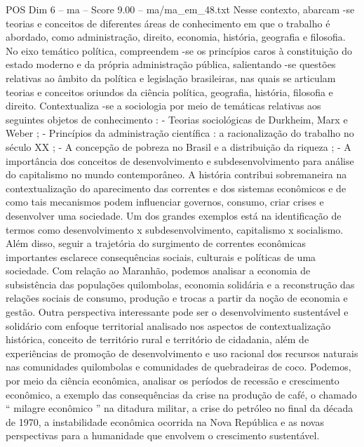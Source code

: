 \begin{textsample}{POS Dim 6 – ma – Score 9.00 – ma/ma\_em\_48.txt}
Nesse contexto, abarcam -se teorias e conceitos de diferentes áreas de conhecimento em que o trabalho é abordado, como administração, direito, economia, história, geografia e filosofia.
No eixo temático política, compreendem -se os princípios caros à constituição do estado moderno e da própria administração pública, salientando -se questões relativas ao âmbito da política e legislação brasileiras, nas quais se articulam teorias e conceitos oriundos da ciência política, geografia, história, filosofia e direito.
Contextualiza -se a sociologia por meio de temáticas relativas aos seguintes objetos de conhecimento : - Teorias sociológicas de Durkheim, Marx e Weber ; - Princípios da administração científica : a racionalização do trabalho no século XX ; - A concepção de pobreza no Brasil e a distribuição da riqueza ; - A importância dos conceitos de desenvolvimento e subdesenvolvimento para análise do capitalismo no mundo contemporâneo.
A história contribui sobremaneira na contextualização do aparecimento das correntes e dos sistemas econômicos e de como tais mecanismos podem influenciar governos, consumo, criar crises e desenvolver uma sociedade.
Um dos grandes exemplos está na identificação de termos como desenvolvimento x subdesenvolvimento, capitalismo x socialismo.
Além disso, seguir a trajetória do surgimento de correntes econômicas importantes esclarece consequências sociais, culturais e políticas de uma sociedade.
Com relação ao Maranhão, podemos analisar a economia de subsistência das populações quilombolas, economia solidária e a reconstrução das relações sociais de consumo, produção e trocas a partir da noção de economia e gestão.
Outra perspectiva interessante pode ser o desenvolvimento sustentável e solidário com enfoque territorial analisado nos aspectos de contextualização histórica, conceito de território rural e território de cidadania, além de experiências de promoção de desenvolvimento e uso racional dos recursos naturais nas comunidades quilombolas e comunidades de quebradeiras de coco.
Podemos, por meio da ciência econômica, analisar os períodos de recessão e crescimento econômico, a exemplo das consequências da crise na produção de café, o chamado “ milagre econômico ” na ditadura militar, a crise do petróleo no final da década de 1970, a instabilidade econômica ocorrida na Nova República e as novas perspectivas para a humanidade que envolvem o crescimento sustentável.

\end{textsample}

